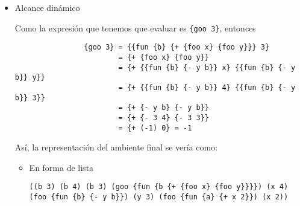 \documentclass[letterpaper,11pt]{article}
\begin{document}
\begin{enumerate}
\begin{enumerate}
\begin{itemize}
            Así, la representación del ambiente final se vería como:
            \begin{itemize}
                \item En forma de lista
                \begin{center}
                    \texttt{((goo \{fun \{b\} \{+ \{foo x\} \{foo y\}\}\}) (b 3) 
                            (x 4) (foo \{fun \{b\} \{- y b\}\}) (b 3) (b 4) (y 3) 
                            (foo \{fun \{a\} \{+ x 2\}\}) (x 2))}
                \end{center}

                \newpage
                \item En forma de pila
                \begin{center}
                \begin{drawstack}[scale=1.78]
                \end{drawstack}
                \end{center}
            \end{itemize}

            \item Alcance dinámico

            Como la expresión que tenemos que evaluar es \texttt{\{goo 3\}},
            entonces 
            \begin{verbatim}
                {goo 3} = {{fun {b} {+ {foo x} {foo y}}} 3}
                        = {+ {foo x} {foo y}}
                        = {+ {{fun {b} {- y b}} x} {{fun {b} {- y b}} y}}
                        = {+ {{fun {b} {- y b}} 4} {{fun {b} {- y b}} 3}}
                        = {+ {- y b} {- y b}}
                        = {+ {- 3 4} {- 3 3}}
                        = {+ (-1) 0} = -1
            \end{verbatim}

            Así, la representación del ambiente final se vería como:
            \begin{itemize}
                \item En forma de lista
                \begin{center}
                    \texttt{((b 3) (b 4) (b 3) (goo \{fun \{b\ \{+ \{foo x\} \{foo y\}\}\}\}) (x 4) (foo \{fun \{b\} \{- y b\}\}) (y 3) (foo \{fun \{a\} \{+ x 2\}\}) (x 2))}    
                \end{center}


\end{itemize}
\end{itemize}
\end{enumerate}
\end{enumerate}
\end{document}
